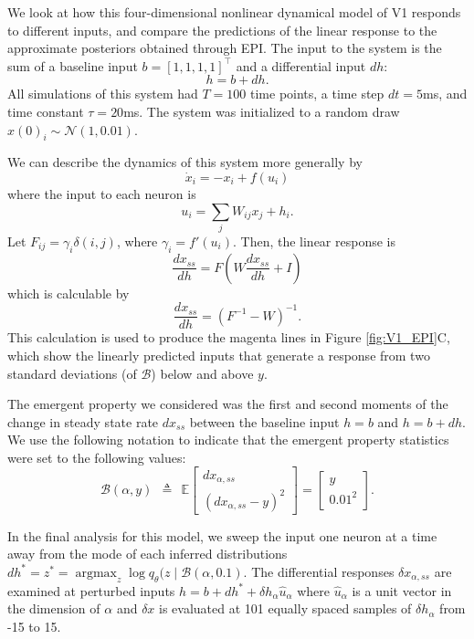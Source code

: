 \documentclass[11pt]{article}
\DeclareMathOperator*{\argmax}{argmax}
\begin{document}
We look at how this four-dimensional nonlinear dynamical model of V1 responds to different inputs, and compare the predictions of the linear response to the approximate posteriors obtained through EPI.  The input to the system is the sum of a baseline input $b = [1, 1, 1, 1]^\top$ and a differential input $dh$:
\begin{equation}
h = b + dh.
\end{equation}
All simulations of this system had $T=100$ time points, a time step $dt = 5$ms, and time constant $\tau = 20$ms.  The system was initialized to a random draw $x(0)_i \sim \mathcal{N}(1, 0.01)$.

We can describe the dynamics of this system more generally by
\begin{equation}
\dot{x}_i = -x_i + f(u_i)
\end{equation}
where the input to each neuron is
\begin{equation}
u_i = \sum_j W_{ij} x_j + h_i.
\end{equation}
Let $F_{ij} = \gamma_i \delta(i,j)$, where $\gamma_i = f'(u_i)$.  Then, the linear response is
\begin{equation}
\frac{dx_{ss}}{dh} = F(W\frac{dx_{ss}}{dh} + I)
\end{equation}
which is calculable by
\begin{equation}
\frac{dx_{ss}}{dh} = (F^{-1} - W)^{-1}.
\end{equation}
This calculation is used to produce the magenta lines in Figure \ref{fig:V1_EPI}C, which show the linearly predicted inputs that generate a response from two standard deviations (of $\mathcal{B}$) below and above $y$.

The emergent property we considered was the first and second moments of the change in steady state rate $dx_{ss}$ between the baseline input $h= b$ and $h = b + dh$.  We use the following notation to indicate that the emergent property statistics were set to the following values:
\begin{equation}
\mathcal{B}(\alpha, y) ~~\triangleq~~ 
\mathbb{E} \begin{bmatrix} dx_{\alpha,ss} \\ (dx_{\alpha,ss} - y)^2 \end{bmatrix} = \begin{bmatrix} y \\ 0.01^2 \end{bmatrix}.
\end{equation}

In the final analysis for this model, we sweep the input one neuron at a time away from the mode of each inferred distributions $dh^* = z^* = \argmax_{z} \log q_\theta(z \mid \mathcal{B}(\alpha, 0.1)$.
The differential responses $\delta x_{\alpha,ss}$ are examined at perturbed inputs  $h = b + dh^* + \delta h_\alpha \hat{u}_\alpha$ where $\hat{u}_\alpha$ is a unit vector in the dimension of $\alpha$ and $\delta x$ is evaluated at 101 equally spaced samples of $\delta h_\alpha$ from -15 to 15.
\end{document}
